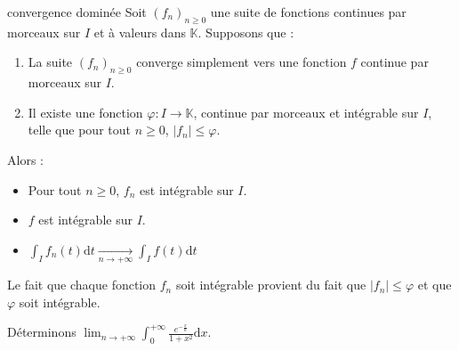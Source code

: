 \documentclass[french,11pt,twoside]{VcCours}
\newcommand{\dx}{\text{d}x}
\newcommand{\dt}{\text{d}t}
\begin{document}
\begin{Theoreme}{convergence dominée}
Soit $(f_n)_{n \geq 0}$ une suite de fonctions continues par morceaux sur $I$ et à valeurs dans $\mathbb{K}$. Supposons que :
\begin{enumerate}
\item La suite $(f_n)_{n \geq 0}$ converge simplement vers une fonction $f$ continue par morceaux sur $I$.
\item Il existe une fonction $\varphi : I \rightarrow \mathbb{K}$, continue par morceaux et intégrable sur $I$, telle que pour tout $n \geq 0$, $\vert f_n \vert \leq \varphi$.
\end{enumerate}
Alors :
\begin{itemize}
\item Pour tout $n \geq 0$, $f_n$ est intégrable sur $I$.
\item $f$ est intégrable sur $I$.
\item $\int_{I} f_n(t) \dt \underset{n \rightarrow + \infty}{ \longrightarrow} \int_{I} f(t) \dt$
\end{itemize}
\end{Theoreme}

\begin{Remarque}{} Le fait que chaque fonction $f_n$ soit intégrable provient du fait que $\vert f_n \vert \leq \varphi$ et que $\varphi$ soit intégrable.
\end{Remarque}

\begin{Exemple} Déterminons $\lim_{n \rightarrow + \infty} \int_{0}^{+ \infty} \frac{e^{- \frac{x}{n}}}{1+x^2} \dx$.

%
%

\vspace{11.5cm}
\end{Exemple}
\end{document}
